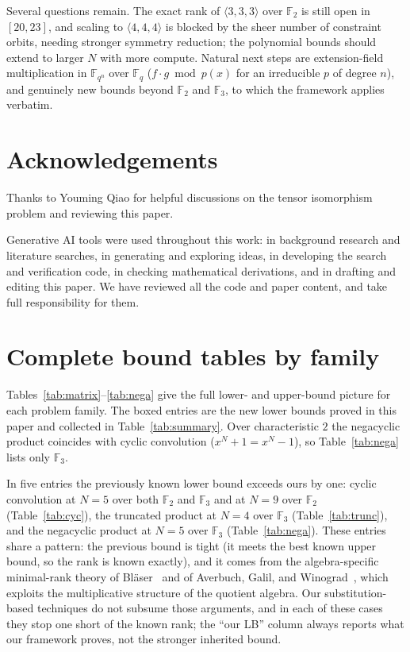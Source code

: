 \documentclass[11pt]{article}
\theoremstyle{definition}
\newcommand{\F}{\mathbb{F}}
\newcommand{\mmt}[3]{\langle #1,#2,#3\rangle}
\begin{document}
Several questions remain. The exact rank of $\mmt{3}{3}{3}$ over $\F_2$ is still
open in $[20,23]$, and scaling to $\mmt{4}{4}{4}$ is blocked by the sheer number of
constraint orbits, needing stronger symmetry reduction; the polynomial bounds should
extend to larger $N$ with more compute. Natural next steps are extension-field
multiplication in $\F_{q^n}$ over $\F_q$ ($f\cdot g \bmod p(x)$ for an irreducible
$p$ of degree $n$), and genuinely new bounds beyond $\F_2$ and $\F_3$, to which the
framework applies verbatim.

\section*{Acknowledgements}
Thanks to Youming Qiao for helpful discussions on the tensor isomorphism problem and reviewing this paper.

Generative AI tools were used throughout this work: in background research and
literature searches, in generating and exploring ideas, in developing the
search and verification code, in checking mathematical derivations, and in drafting and
editing this paper. We have reviewed all the code and paper content, and take
full responsibility for them.



\appendix

\section{Complete bound tables by family}\label{app:bound-tables}

Tables~\ref{tab:matrix}--\ref{tab:nega} give the full lower- and upper-bound picture
for each problem family. The boxed entries are the new lower bounds proved in this
paper and collected in Table~\ref{tab:summary}. Over characteristic $2$ the negacyclic product coincides with cyclic
convolution ($x^N+1=x^N-1$), so Table~\ref{tab:nega} lists only $\F_3$.

In five entries the previously known lower bound exceeds ours by one: cyclic
convolution at $N=5$ over both $\F_2$ and $\F_3$ and at $N=9$ over $\F_2$
(Table~\ref{tab:cyc}), the truncated product at $N=4$ over $\F_3$
(Table~\ref{tab:trunc}), and the negacyclic product at $N=5$ over $\F_3$
(Table~\ref{tab:nega}). These entries share a pattern: the previous bound is tight
(it meets the best known upper bound, so the rank is known exactly), and it comes
from the algebra-specific minimal-rank theory of Bl\"aser~\cite{blaser2005complete}
and of Averbuch, Galil, and Winograd~\cite{averbuch1991classification}, which
exploits the multiplicative structure of the quotient algebra. Our
substitution-based techniques do not subsume those arguments, and in each of these
cases they stop one short of the known rank; the ``our LB'' column always reports
what our framework proves, not the stronger inherited bound.
\end{document}
